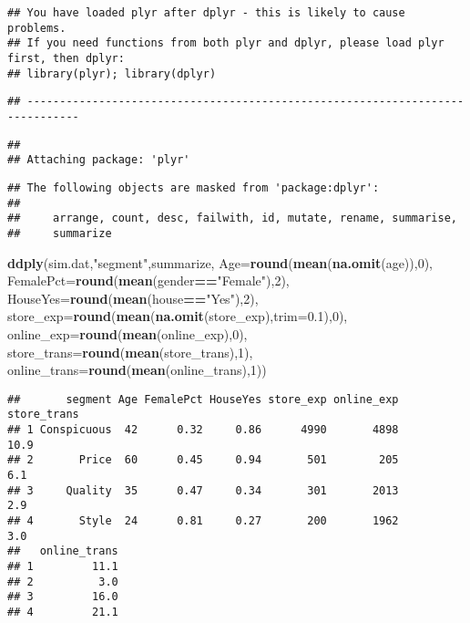 \documentclass[
]{article}
\newenvironment{Shaded}{\begin{snugshade}}{\end{snugshade}}
\newcommand{\DataTypeTok}[1]{\textcolor[rgb]{0.13,0.29,0.53}{#1}}
\newcommand{\DecValTok}[1]{\textcolor[rgb]{0.00,0.00,0.81}{#1}}
\newcommand{\FloatTok}[1]{\textcolor[rgb]{0.00,0.00,0.81}{#1}}
\newcommand{\KeywordTok}[1]{\textcolor[rgb]{0.13,0.29,0.53}{\textbf{#1}}}
\newcommand{\NormalTok}[1]{#1}
\newcommand{\OperatorTok}[1]{\textcolor[rgb]{0.81,0.36,0.00}{\textbf{#1}}}
\newcommand{\StringTok}[1]{\textcolor[rgb]{0.31,0.60,0.02}{#1}}
\begin{document}
\begin{verbatim}
## You have loaded plyr after dplyr - this is likely to cause problems.
## If you need functions from both plyr and dplyr, please load plyr first, then dplyr:
## library(plyr); library(dplyr)
\end{verbatim}

\begin{verbatim}
## ------------------------------------------------------------------------------
\end{verbatim}

\begin{verbatim}
## 
## Attaching package: 'plyr'
\end{verbatim}

\begin{verbatim}
## The following objects are masked from 'package:dplyr':
## 
##     arrange, count, desc, failwith, id, mutate, rename, summarise,
##     summarize
\end{verbatim}

\begin{Shaded}
\begin{Highlighting}[]
\KeywordTok{ddply}\NormalTok{(sim.dat,}\StringTok{"segment"}\NormalTok{,summarize, }\DataTypeTok{Age=}\KeywordTok{round}\NormalTok{(}\KeywordTok{mean}\NormalTok{(}\KeywordTok{na.omit}\NormalTok{(age)),}\DecValTok{0}\NormalTok{),}
      \DataTypeTok{FemalePct=}\KeywordTok{round}\NormalTok{(}\KeywordTok{mean}\NormalTok{(gender}\OperatorTok{==}\StringTok{"Female"}\NormalTok{),}\DecValTok{2}\NormalTok{),}
      \DataTypeTok{HouseYes=}\KeywordTok{round}\NormalTok{(}\KeywordTok{mean}\NormalTok{(house}\OperatorTok{==}\StringTok{"Yes"}\NormalTok{),}\DecValTok{2}\NormalTok{),}
      \DataTypeTok{store_exp=}\KeywordTok{round}\NormalTok{(}\KeywordTok{mean}\NormalTok{(}\KeywordTok{na.omit}\NormalTok{(store_exp),}\DataTypeTok{trim=}\FloatTok{0.1}\NormalTok{),}\DecValTok{0}\NormalTok{),}
      \DataTypeTok{online_exp=}\KeywordTok{round}\NormalTok{(}\KeywordTok{mean}\NormalTok{(online_exp),}\DecValTok{0}\NormalTok{),}
      \DataTypeTok{store_trans=}\KeywordTok{round}\NormalTok{(}\KeywordTok{mean}\NormalTok{(store_trans),}\DecValTok{1}\NormalTok{),}
      \DataTypeTok{online_trans=}\KeywordTok{round}\NormalTok{(}\KeywordTok{mean}\NormalTok{(online_trans),}\DecValTok{1}\NormalTok{))}
\end{Highlighting}
\end{Shaded}

\begin{verbatim}
##       segment Age FemalePct HouseYes store_exp online_exp store_trans
## 1 Conspicuous  42      0.32     0.86      4990       4898        10.9
## 2       Price  60      0.45     0.94       501        205         6.1
## 3     Quality  35      0.47     0.34       301       2013         2.9
## 4       Style  24      0.81     0.27       200       1962         3.0
##   online_trans
## 1         11.1
## 2          3.0
## 3         16.0
## 4         21.1
\end{verbatim}
\end{document}
